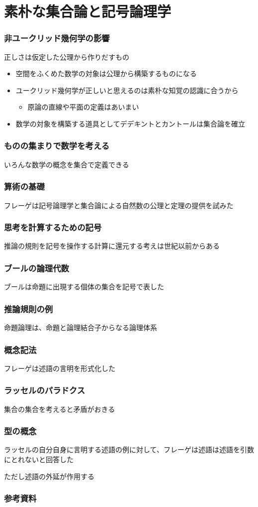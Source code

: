 \documentclass[unicode, 14pt, aspectratio=169]{beamer}
\begin{document}
\section{素朴な集合論と記号論理学}
\begin{frame}
  \frametitle{非ユークリッド幾何学の影響}
  {\large 正しさは仮定した公理から作りだすもの}
  \begin{itemize}
  \item 空間をふくめた数学の対象は公理から構築するものになる
  \item ユークリッド幾何学が正しいと思えるのは素朴な知覚の認識に合うから
    \begin{itemize}
    \item 原論の直線や平面の定義はあいまい
    \end{itemize}
  \item 数学の対象を構築する道具としてデデキントとカントールは集合論を確立
  \end{itemize}
\end{frame}
\begin{frame}
  \frametitle{ものの集まりで数学を考える}
  {\large いろんな数学の概念を集合で定義できる}
\end{frame}
\begin{frame}
  \frametitle{算術の基礎}
  {\large フレーゲは記号論理学と集合論による自然数の公理と定理の提供を試みた}
\end{frame}
\begin{frame}
  \frametitle{思考を計算するための記号}
  {\large 推論の規則を記号を操作する計算に還元する考えは世紀以前からある}
\end{frame}
\begin{frame}
  \frametitle{ブールの論理代数}
  {\large ブールは命題に出現する個体の集合を記号で表した}
\end{frame}
\begin{frame}
  \frametitle{推論規則の例}
  {\large 命題論理は、命題と論理結合子からなる論理体系}
\end{frame}
\begin{frame}
  \frametitle{概念記法}
  {\large フレーゲは述語の言明を形式化した}
\end{frame}
\begin{frame}
  \frametitle{ラッセルのパラドクス}
  {\large 集合の集合を考えると矛盾がおきる}
\end{frame}
\begin{frame}
  \frametitle{型の概念}
  ラッセルの自分自身に言明する述語の例に対して、フレーゲは述語は述語を引数にとれないと回答した

  ただし述語の外延が作用する
\end{frame}
\begin{frame}[allowframebreaks,t]
  \frametitle{参考資料}
  \printbibliography
  \nocite{*}
\end{frame}
\end{document}
